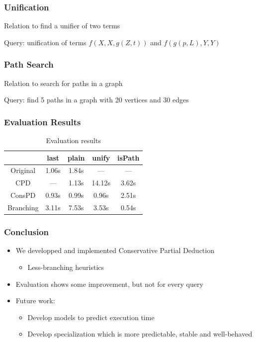 \documentclass[xcolor=table]{beamer}
\begin{document}
\begin{frame}[fragile]
  \frametitle{Unification}
Relation to find a unifier of two terms

\vspace{0.5cm}

Query: unification of terms $f (X, X, g(Z,t))$ and $f (g(p,L),Y,Y)$
\end{frame}

\begin{frame}[fragile]
  \frametitle{Path Search}
Relation to search for paths in a graph

\vspace{0.5cm}

Query: find 5 paths in a graph with 20 vertices and 30 edges

\end{frame}

\begin{frame}[fragile]
  \frametitle{Evaluation Results}

  \begin{table}
    \centering
    \begin{tabular}{c||c|c||c||c}
                     & last  & plain & unify  & isPath \\ \hline\hline
    Original         & 1.06s & 1.84s & ---    & ---    \\ \hline
    CPD              & ---   & 1.13s & 14.12s & 3.62s  \\ \hline
    ConsPD           & 0.93s & 0.99s & 0.96s  & 2.51s  \\ \hline
    Branching        & 3.11s & 7.53s & 3.53s  & 0.54s  \\ \hline
    \end{tabular}

    \caption{Evaluation results}
  \end{table}

\end{frame}

\begin{frame}[fragile]
  \frametitle{Conclusion}
  \begin{itemize}
    \item We developped and implemented Conservative Partial Deduction
    \begin{itemize}
      \item Less-branching heuristics
    \end{itemize}
    \item Evaluation shows some improvement, but not for every query
    \item Future work:
    \begin{itemize}
      \item Develop models to predict execution time
      \item Develop specialization which is more predictable, stable and well-behaved
    \end{itemize}
  \end{itemize}
\end{frame}
\end{document}
